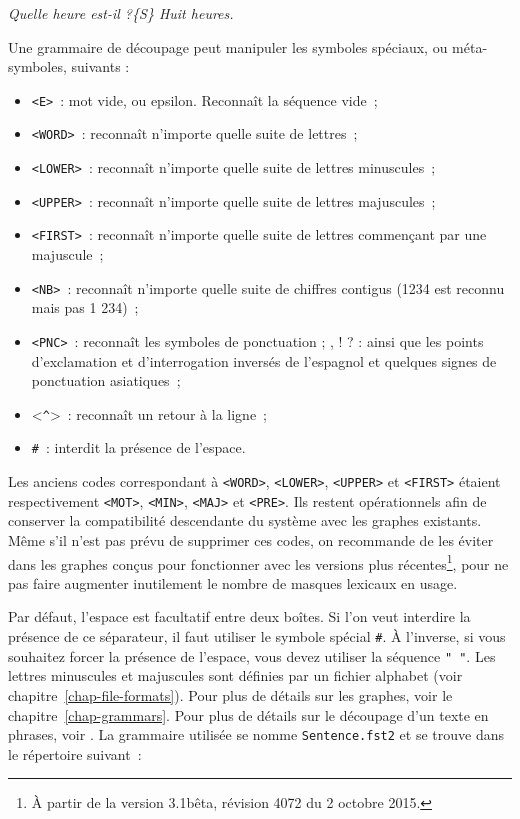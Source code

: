 \bigskip
\textit{Quelle heure est-il ?\{S\} Huit heures.}

\bigskip
\noindent Une grammaire de découpage peut manipuler les symboles spéciaux, ou méta-symboles, suivants :

\index{\verbc{<^>}}\index{\verbt{\#}}
\begin{itemize}
  \item \verb+<E>+~: mot vide, ou epsilon. Reconnaît la séquence vide~;
  \item \verb+<WORD>+~: reconnaît n’importe quelle suite de lettres~;
  \item \verb+<LOWER>+~: reconnaît n’importe quelle suite de lettres minuscules~;
  \item \verb+<UPPER>+~: reconnaît n’importe quelle suite de lettres majuscules~;
  \item \verb+<FIRST>+~: reconnaît n’importe quelle suite de lettres commençant par une majuscule~;
  \item \verb+<NB>+~: reconnaît n’importe quelle suite de chiffres contigus (1234 est reconnu mais pas 1 234)~; 
  \item \verb+<PNC>+~: reconnaît les symboles de ponctuation ; , ! ? : ainsi que les points d’exclamation
  	  et d’interrogation inversés de l’espagnol et quelques signes de ponctuation asiatiques~;
  \item <\verb+^+>~: reconnaît un retour à la ligne~;
  \item \verb+#+~: interdit la présence de l’espace.
\end{itemize}

\noindent  Les anciens codes correspondant à \verb+<WORD>+, \verb+<LOWER>+, \verb+<UPPER>+ et \verb+<FIRST>+
 étaient respectivement \verb+<MOT>+, \verb+<MIN>+, \verb+<MAJ>+ et \verb+<PRE>+.
 Ils restent opérationnels afin de conserver la compatibilité descendante
 du système avec les graphes existants. Même s'il n'est pas prévu de supprimer ces codes, on recommande de les éviter dans les graphes conçus pour fonctionner avec les versions plus récentes\footnote{À partir de la version 3.1bêta, révision 4072 du 2 octobre 2015.},
pour ne pas faire augmenter inutilement le nombre de masques lexicaux en usage.

\bigskip
\noindent Par défaut, l’espace est facultatif entre deux boîtes. Si l’on veut interdire la présence
de ce séparateur, il faut utiliser le symbole spécial \verb+#+. À l’inverse, si vous souhaitez
forcer la présence de l’espace, vous devez utiliser la séquence \verb+" "+. Les lettres minuscules
et majuscules sont définies par un fichier alphabet
(voir chapitre~\ref{chap-file-formats}). Pour plus de détails sur les graphes,
voir le chapitre~\ref{chap-grammars}. Pour plus de détails sur le découpage d’un texte en phrases,
voir \cite{ameliorer-decoupage-en-phrases}. La grammaire utilisée se nomme \verb+Sentence.fst2+ et
se trouve dans le répertoire suivant~:

